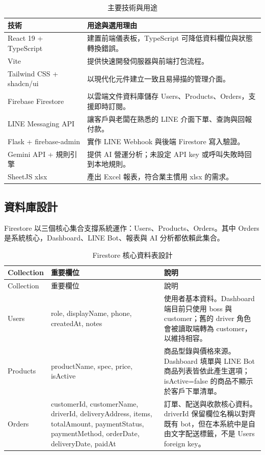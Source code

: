 \documentclass[12pt,a4paper,UTF8,fontset=none]{ctexart}
\newcommand{\code}[1]{{\ttfamily\small #1}}
\begin{document}
\begin{table}[H]
  \centering
  \caption{主要技術與用途}
  \begin{tabularx}{\textwidth}{L{3.3cm}Y}
    \toprule
    技術 & 用途與選用理由 \\
    \midrule
    React 19 + TypeScript & 建置前端儀表板，TypeScript 可降低資料欄位與狀態轉換錯誤。 \\
    Vite & 提供快速開發伺服器與前端打包流程。 \\
    Tailwind CSS + shadcn/ui & 以現代化元件建立一致且易掃描的管理介面。 \\
    Firebase Firestore & 以雲端文件資料庫儲存 Users、Products、Orders，支援即時訂閱。 \\
    LINE Messaging API & 讓客戶與老闆在熟悉的 LINE 介面下單、查詢與回報付款。 \\
    Flask + firebase-admin & 實作 LINE Webhook 與後端 Firestore 寫入驗證。 \\
    Gemini API + 規則引擎 & 提供 AI 營運分析；未設定 API key 或呼叫失敗時回到本地規則。 \\
    SheetJS xlsx & 產出 Excel 報表，符合業主慣用 xlsx 的需求。 \\
    \bottomrule
  \end{tabularx}
\end{table}

\subsection{資料庫設計}

Firestore 以三個核心集合支撐系統運作：Users、Products、Orders。其中 Orders 是系統核心，Dashboard、LINE Bot、報表與 AI 分析都依賴此集合。

\begin{longtable}{L{2.5cm}L{3.6cm}L{7.4cm}}
  \caption{Firestore 核心資料表設計} \\
  \toprule
  Collection & 重要欄位 & 說明 \\
  \midrule
  \endfirsthead
  \toprule
  Collection & 重要欄位 & 說明 \\
  \midrule
  \endhead
  Users &
  \code{role}, \code{displayName}, \code{phone}, \code{createdAt}, \code{notes} &
  使用者基本資料。Dashboard 端目前只使用 \code{boss} 與 \code{customer}；舊的 \code{driver} 角色會被讀取端轉為 customer，以維持相容。 \\
  Products &
  \code{productName}, \code{spec}, \code{price}, \code{isActive} &
  商品型錄與價格來源。Dashboard 填單與 LINE Bot 商品列表皆依此產生選項；\code{isActive=false} 的商品不顯示於客戶下單清單。 \\
  Orders &
  \code{customerId}, \code{customerName}, \code{driverId}, \code{deliveryAddress}, \code{items}, \code{totalAmount}, \code{paymentStatus}, \code{paymentMethod}, \code{orderDate}, \code{deliveryDate}, \code{paidAt} &
  訂單、配送與收款核心資料。\code{driverId} 保留欄位名稱以對齊既有 bot，但在本系統中是自由文字配送標籤，不是 Users foreign key。 \\
  \bottomrule
\end{longtable}
\end{document}
